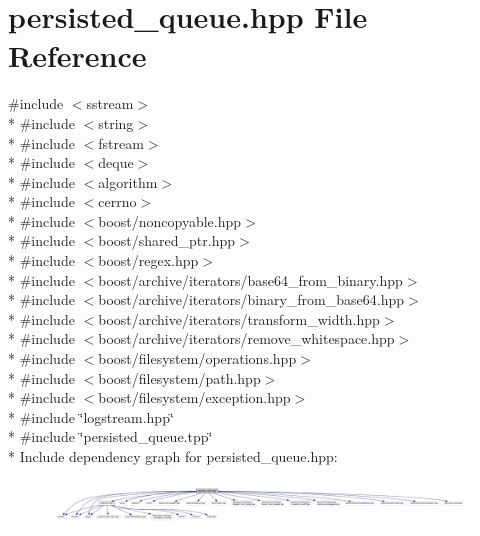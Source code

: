 \hypertarget{a00070}{\section{persisted\-\_\-queue.\-hpp File Reference}
\label{a00070}
}
{\ttfamily \#include $<$sstream$>$}\\*
{\ttfamily \#include $<$string$>$}\\*
{\ttfamily \#include $<$fstream$>$}\\*
{\ttfamily \#include $<$deque$>$}\\*
{\ttfamily \#include $<$algorithm$>$}\\*
{\ttfamily \#include $<$cerrno$>$}\\*
{\ttfamily \#include $<$boost/noncopyable.\-hpp$>$}\\*
{\ttfamily \#include $<$boost/shared\-\_\-ptr.\-hpp$>$}\\*
{\ttfamily \#include $<$boost/regex.\-hpp$>$}\\*
{\ttfamily \#include $<$boost/archive/iterators/base64\-\_\-from\-\_\-binary.\-hpp$>$}\\*
{\ttfamily \#include $<$boost/archive/iterators/binary\-\_\-from\-\_\-base64.\-hpp$>$}\\*
{\ttfamily \#include $<$boost/archive/iterators/transform\-\_\-width.\-hpp$>$}\\*
{\ttfamily \#include $<$boost/archive/iterators/remove\-\_\-whitespace.\-hpp$>$}\\*
{\ttfamily \#include $<$boost/filesystem/operations.\-hpp$>$}\\*
{\ttfamily \#include $<$boost/filesystem/path.\-hpp$>$}\\*
{\ttfamily \#include $<$boost/filesystem/exception.\-hpp$>$}\\*
{\ttfamily \#include \char`\"{}logstream.\-hpp\char`\"{}}\\*
{\ttfamily \#include \char`\"{}persisted\-\_\-queue.\-tpp\char`\"{}}\\*
Include dependency graph for persisted\-\_\-queue.\-hpp\-:\nopagebreak
\begin{figure}[H]
\begin{center}
\leavevmode
\includegraphics[width=350pt]{a00113}
\end{center}
\end{figure}
